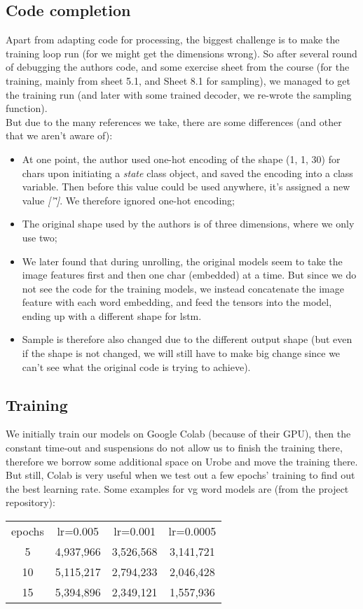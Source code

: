\documentclass[a4paper]{scrartcl}
\begin{document}
\subsection*{Code completion}
Apart from adapting code for processing, the biggest challenge is to make the training loop run (for we might get the dimensions wrong). So after several round of debugging the authors code, and some exercise sheet from the course (for the training, mainly from sheet 5.1, and Sheet 8.1 for sampling), we managed to get the training run (and later with some trained decoder, we re-wrote the sampling function). \\
But due to the many references we take, there are some differences (and other that we aren't aware of): 
\begin{itemize}
  \item At one point, the author used one-hot encoding of the shape (1, 1, 30) for chars upon initiating a \emph{state} class object, and saved the encoding into a class variable. Then before this value could be used anywhere, it's assigned a new value \emph{['\^']}. We therefore ignored one-hot encoding;
  \item The original shape used by the authors is of three dimensions, where we only use two;
  \item We later found that during unrolling, the original models seem to take the image features first and then one char (embedded) at a time. But since we do not see the code for the training models, we instead concatenate the image feature with each word embedding, and feed the tensors into the model, ending up with a different shape for lstm.  
  \item Sample is therefore also changed due to the different output shape (but even if the shape is not changed, we will still have to make big change since we can't see what the original code is trying to achieve). 
\end{itemize}

\subsection*{Training}
We initially train our models on Google Colab (because of their GPU), then the constant time-out and suspensions do not allow us to finish the training there, therefore we borrow some additional space on Urobe and move the training there. But still, Colab is very useful when we test out a few epochs' training to find out the best learning rate. Some examples for vg word models are (from the project repository):
\begin{center}
\begin{tabular}{ c c c c }
 epochs &  lr=0.005 & lr=0.001 & lr=0.0005\\ 
 5 & 4,937,966 & 3,526,568 & 3,141,721\\  
 10 & 5,115,217 & 2,794,233 & 2,046,428\\  
 15 & 5,394,896 & 2,349,121 & 1,557,936\\
\end{tabular}
\end{center}
\end{document}
